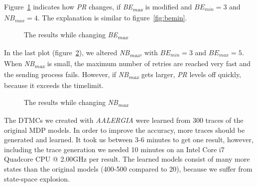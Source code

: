 \documentclass[
a4paper,
12pt
]{scrartcl}
\begin{document}
Figure~\ref{fig:bemax} indicates how \textit{PR} changes, if \textit{BE\textsubscript{max}} is modified and $BE_{min}=3$ and $NB_{max}=4$. The explanation is similar to figure~\ref{fig:bemin}.

\begin{figure}[H]
\centering
 \caption{The results while changing \textit{BE\textsubscript{max}}}
    \label{fig:bemax}
\end{figure}

In the last plot (figure~\ref{fig:nbmax}), we altered \textit{NB\textsubscript{max}}, with $BE_{min}=3$ and $BE_{max}=5$. When \textit{NB\textsubscript{max}} is small, the maximum number of retries are reached very fast and the sending process fails. However, if \textit{NB\textsubscript{max}} gets larger, \textit{PR} levels off quickly, because it exceeds the timelimit. 

\begin{figure}[H]
\centering
 \caption{The results while changing \textit{NB\textsubscript{max}}}
   \label{fig:nbmax}
\end{figure}

The DTMCs we created with \emph{AALERGIA} were learned from 300 traces of the original MDP models. In order to improve the accuracy, more traces should be generated and learned. It took us between 3-6 minutes to get one result, however, including the trace generation we needed 10 minutes on an Intel Core i7 Quadcore CPU @ 2.00GHz per result. The learned  models consist of many more states than the original models (400-500 compared to 20), because we suffer from state-space explosion.
\end{document}
